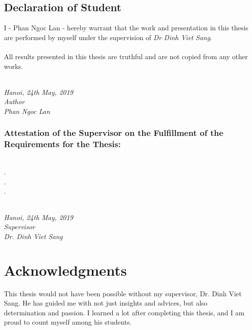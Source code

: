 \documentclass[a4paper, 13pt, oneside]{report}
\begin{document}
\begin{spacing}{1.0}
    \section*{Declaration of Student}
    I - Phan Ngoc Lan - hereby warrant that the work and presentation in this thesis are performed by myself under the supervision of \textit{Dr Dinh Viet Sang}.\\\\
    All results presented in this thesis are truthful and are not copied from any other works.\\\\
    \begin{minipage}{0.5\textwidth}
        \hfill
    \end{minipage}
    \begin{minipage}[t]{0.5\textwidth}
        \begin{center}
        \textit{Hanoi, 24th May, 2019\\Author\\[2.5cm]Phan Ngoc Lan}
        \end{center}
    \end{minipage}
    \subsection*{Attestation of the Supervisor on the Fulfillment of the
    Requirements for the Thesis:}
    \dotfill\\.\dotfill\\.\dotfill\\.\dotfill\\\\
    \begin{minipage}{0.5\textwidth}
        \hfill
    \end{minipage}
    \begin{minipage}[t]{0.5\textwidth}
        \begin{center}
    \textit{Hanoi, 24th May, 2019\\Supervisor\\[2.5cm]Dr. Dinh Viet Sang}
        \end{center}
    \end{minipage}
\end{spacing}

\chapter*{Acknowledgments}
This thesis would not have been possible without my supervisor, Dr. Dinh Viet Sang. He has guided me with not just insights and advices, but also determination and passion. I learned a lot after completing this thesis, and I am proud to count myself among his students.
\end{document}
